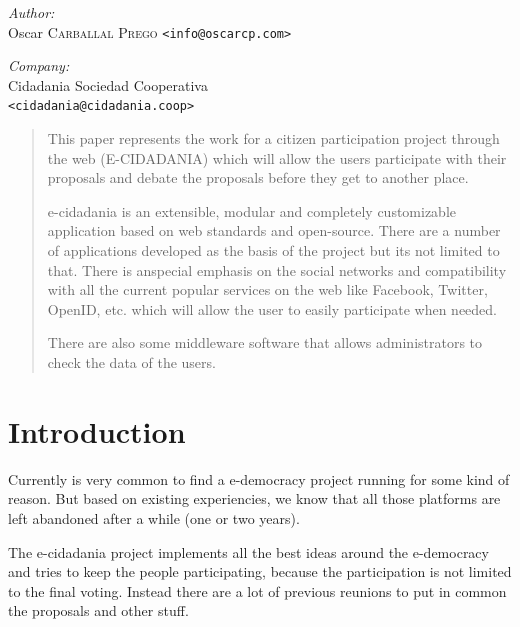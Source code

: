 \documentclass{article}
\begin{document}
\begin{titlepage}
\begin{center}
\end{center}

\begin{minipage}{0.5\textwidth}
\begin{flushleft}
\emph{Author:}\\
Oscar \textsc{Carballal Prego} \texttt{<info@oscarcp.com>}
\end{flushleft}
\end{minipage}
\begin{minipage}{0.5\textwidth}
\begin{flushright}
\emph{Company:}\\
Cidadania Sociedad Cooperativa\\
\texttt{<cidadania@cidadania.coop>}
\end{flushright}
\end{minipage}
\end{titlepage}

\newpage

\begin{abstract}
This paper represents the work for a citizen participation project through the web (E-CIDADANIA) which will allow the users participate with their proposals and debate the proposals before they get to another place.

e-cidadania is an extensible, modular and completely customizable application based on web standards and open-source. There are a number of applications developed as the basis of the project but its not limited to that. There is anspecial emphasis on the social networks and compatibility with all the current popular services on the web like Facebook, Twitter, OpenID, etc. which will allow the user to easily participate when needed.

There are also some middleware software that allows administrators to check the data of the users.
\end{abstract}
\newpage

\tableofcontents
\newpage

\section{Introduction}
Currently is very common to find a e-democracy project running for some kind of reason. But based on existing experiencies, we know that all those platforms are left abandoned after a while (one or two years).

The e-cidadania project implements all the best ideas around the e-democracy and tries to keep the people participating, because the participation is not limited to the final voting. Instead there are a lot of previous reunions to put in common the proposals and other stuff.
\end{document}
